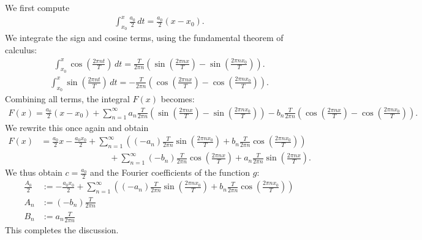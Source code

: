\documentclass[11pt]{article}
\begin{document}
\begin{solution}
    We first compute 
    \begin{gather*}
        \int_{x_0}^x \frac{a_0}{2} \, dt = \frac{a_0}{2} (x - x_0).
    \end{gather*}
    We integrate the sign and cosine terms, using the fundamental theorem of calculus:
    \begin{gather*}
        \int_{x_0}^x \cos\left(\frac{2\pi n t}{T}\right) \, dt 
        = 
        \frac{T}{2\pi n} \left( \sin\left(\frac{2\pi n x}{T}\right) - \sin\left(\frac{2\pi n x_0}{T}\right) \right).
    \end{gather*}
    \begin{gather*}
        \int_{x_0}^x \sin\left(\frac{2\pi n t}{T}\right) \, dt 
        = 
        -\frac{T}{2\pi n} \left( \cos\left(\frac{2\pi n x}{T}\right) - \cos\left(\frac{2\pi n x_0}{T}\right) \right).
    \end{gather*}
    Combining all terms, the integral \( F(x) \) becomes:
    \begin{gather*}
        F(x) 
        = 
        \frac{a_0}{2} (x - x_0) 
        + 
        \sum_{n=1}^\infty 
        a_n \frac{T}{2\pi n} \left( \sin\left(\frac{2\pi n x}{T}\right) - \sin\left(\frac{2\pi n x_0}{T}\right) \right) 
        - 
        b_n \frac{T}{2\pi n} \left( \cos\left(\frac{2\pi n x}{T}\right) - \cos\left(\frac{2\pi n x_0}{T}\right) \right).
    \end{gather*}
    We rewrite this once again and obtain
    \begin{align*}
        F(x) 
        &
        = 
        \frac{a_0}{2} x 
        - 
        \frac{a_0 x_0 }{2}
        + 
        \sum_{n=1}^\infty 
        \left( 
        (-a_n) \frac{T}{2\pi n} \sin\left(\frac{2\pi n x_0}{T}\right) 
        + 
        b_n \frac{T}{2\pi n} \cos\left(\frac{2\pi n x_0}{T}\right) 
        \right)
        \\&\qquad\qquad\qquad\qquad 
        + 
        \sum_{n=1}^\infty 
        (-b_n) \frac{T}{2\pi n} \cos\left(\frac{2\pi n x}{T}\right)
        + 
        a_n \frac{T}{2\pi n} \sin\left(\frac{2\pi n x}{T}\right) 
        .
    \end{align*}
    We thus obtain $c = \frac{a_0}{2}$ and the Fourier coefficients of the function $g$:
    \begin{align*}
        \frac{A_0}{2} &:= -\frac{a_0 x_0 }{2}
        + 
        \sum_{n=1}^\infty 
        \left( 
        (-a_n) \frac{T}{2\pi n} \sin\left(\frac{2\pi n x_0}{T}\right) 
        + 
        b_n \frac{T}{2\pi n} \cos\left(\frac{2\pi n x_0}{T}\right) 
        \right)
        \\
        A_n &:= (-b_n) \frac{T}{2\pi n} 
        \\
        B_n &:= a_n \frac{T}{2\pi n} 
    \end{align*}
    This completes the discussion. 
\end{solution}
\end{document}
